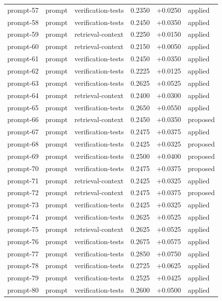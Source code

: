 \begin{center}
\begin{longtable}{llp{5.2cm}rrl}
prompt-57 & prompt & verification-tests & 0.2350 & +0.0250 & applied \\
prompt-58 & prompt & verification-tests & 0.2450 & +0.0350 & applied \\
prompt-59 & prompt & retrieval-context & 0.2250 & +0.0150 & applied \\
prompt-60 & prompt & retrieval-context & 0.2150 & +0.0050 & applied \\
prompt-61 & prompt & verification-tests & 0.2450 & +0.0350 & applied \\
prompt-62 & prompt & verification-tests & 0.2225 & +0.0125 & applied \\
prompt-63 & prompt & verification-tests & 0.2625 & +0.0525 & applied \\
prompt-64 & prompt & retrieval-context & 0.2400 & +0.0300 & applied \\
prompt-65 & prompt & verification-tests & 0.2650 & +0.0550 & applied \\
prompt-66 & prompt & retrieval-context & 0.2450 & +0.0350 & proposed \\
prompt-67 & prompt & verification-tests & 0.2475 & +0.0375 & applied \\
prompt-68 & prompt & verification-tests & 0.2425 & +0.0325 & proposed \\
prompt-69 & prompt & verification-tests & 0.2500 & +0.0400 & proposed \\
prompt-70 & prompt & verification-tests & 0.2475 & +0.0375 & proposed \\
prompt-71 & prompt & retrieval-context & 0.2425 & +0.0325 & applied \\
prompt-72 & prompt & retrieval-context & 0.2475 & +0.0375 & proposed \\
prompt-73 & prompt & verification-tests & 0.2425 & +0.0325 & applied \\
prompt-74 & prompt & verification-tests & 0.2625 & +0.0525 & applied \\
prompt-75 & prompt & retrieval-context & 0.2625 & +0.0525 & applied \\
prompt-76 & prompt & verification-tests & 0.2675 & +0.0575 & applied \\
prompt-77 & prompt & verification-tests & 0.2850 & +0.0750 & applied \\
prompt-78 & prompt & verification-tests & 0.2725 & +0.0625 & applied \\
prompt-79 & prompt & verification-tests & 0.2525 & +0.0425 & applied \\
prompt-80 & prompt & verification-tests & 0.2600 & +0.0500 & applied \\

\end{longtable}
\end{center}
